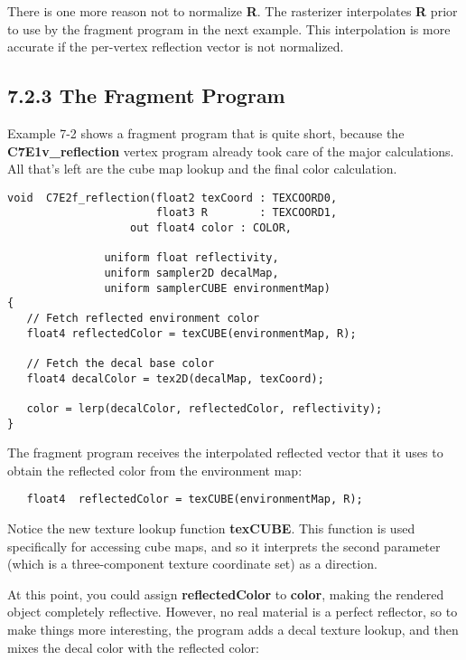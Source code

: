 \documentclass[../main.tex]{subfiles}
\begin{document}
There is one more reason not to normalize \textbf{R}. The rasterizer interpolates \textbf{R} prior to use by the fragment program in the next example. This interpolation is more accurate if the per-vertex reflection vector is not normalized.

\subsection{7.2.3 The Fragment Program}

Example 7-2 shows a fragment program that is quite short, because the \textbf{C7E1v_reflection} vertex program already took care of the major calculations. All that's left are the cube map lookup and the final color calculation.

\FloatBarrier
\begin{lstlisting}[caption=Example 7-2. The \textbf{C7E2f_reflection} Fragment Program]
void  C7E2f_reflection(float2 texCoord : TEXCOORD0,
                       float3 R        : TEXCOORD1,
                   out float4 color : COLOR,

               uniform float reflectivity,
               uniform sampler2D decalMap,
               uniform samplerCUBE environmentMap)
{
   // Fetch reflected environment color
   float4 reflectedColor = texCUBE(environmentMap, R);

   // Fetch the decal base color
   float4 decalColor = tex2D(decalMap, texCoord);

   color = lerp(decalColor, reflectedColor, reflectivity);
}
\end{lstlisting}
\FloatBarrier

The fragment program receives the interpolated reflected vector that it uses to obtain the reflected color from the environment map:

\FloatBarrier
\begin{lstlisting}
   float4  reflectedColor = texCUBE(environmentMap, R);
\end{lstlisting}
\FloatBarrier
   
Notice the new texture lookup function \textbf{texCUBE}. This function is used specifically for accessing cube maps, and so it interprets the second parameter (which is a three-component texture coordinate set) as a direction.

At this point, you could assign \textbf{reflectedColor} to \textbf{color}, making the rendered object completely reflective. However, no real material is a perfect reflector, so to make things more interesting, the program adds a decal texture lookup, and then mixes the decal color with the reflected color:
\end{document}

